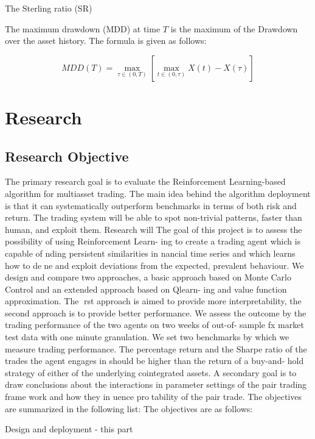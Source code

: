 \documentclass{pracamgr_wne}\usepackage[]{graphicx}\usepackage[]{color}
\begin{document}
The Sterling ratio (SR)


The maximum drawdown (MDD) at time $T$ is the maximum of the Drawdown over the asset history. The formula is given as follows:

\begin{equation}
MDD(T)=\max_{\tau\in (0,T)}[\max_{t\in (0,\tau)} X(t)-X(\tau)]
\end{equation}

\chapter{Research}




\section{Research Objective}

The primary research goal is to evaluate the Reinforcement Learning-based algorithm for multiasset trading.
The main idea behind the algorithm deployment is that it can systematically outperform benchmarks 
in terms of both risk and return. 
The trading system will be able to spot non-trivial patterns, faster than human, and exploit them.
Research will
The goal of this project is to assess the possibility of using Reinforcement Learn-
ing to create a trading agent which is capable of nding persistent similarities in 
nancial time series and which learns how to dene and exploit deviations from
the expected, prevalent behaviour. We design and compare two approaches, a basic
approach based on Monte Carlo Control and an extended approach based on Qlearn-
ing and value function approximation. The rst approach is aimed to provide more
interpretability, the second approach is to provide better performance. We assess
the outcome by the trading performance of the two agents on two weeks of out-of-
sample fx market test data with one minute granulation. We set two benchmarks by
which we measure trading performance. The percentage return and the Sharpe ratio
of the trades the agent engages in should be higher than the return of a buy-and-
hold strategy of either of the underlying cointegrated assets. A secondary goal is
to draw conclusions about the interactions in parameter settings of the pair trading
frame work and how they in
uence protability of the pair trade. The objectives
are summarized in the following list:
The objectives are as follows:

Design and deployment - this part 


\printbibliography


\listoffigures
\listoftables
\end{document}
